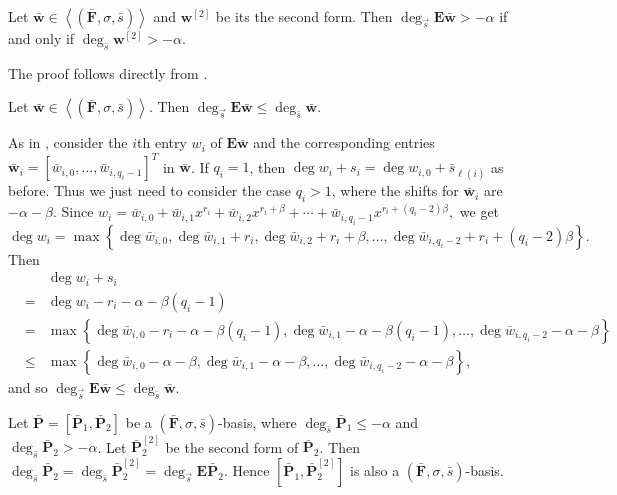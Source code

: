 \begin{cor}
\label{cor:degreeCorrespondence}Let $\bar{\mathbf{w}}\in\left\langle \left(\bar{\mathbf{F}},\sigma,\bar{s}\right)\right\rangle $
and $\mathbf{w}^{[2]}$ be its the second form. Then $\deg_{\vec{s}}\mathbf{E}\bar{\mathbf{w}}>-\alpha$
if and only if $\deg_{\bar{s}}\mathbf{w}^{[2]}>-\alpha$.\end{cor}
\begin{pf}
The proof follows directly from .\end{pf}
\begin{lem}
\label{lem:degEwLessEqDegw}Let $\bar{\mathbf{w}}\in\left\langle \left(\bar{\mathbf{F}},\sigma,\bar{s}\right)\right\rangle $.
Then $\deg_{\vec{s}}\mathbf{E}\bar{\mathbf{w}}\le\deg_{\bar{s}}\bar{\mathbf{w}}$. \end{lem}
\begin{pf}
As in , consider the $i$th entry
$w_{i}$ of $\mathbf{E}\bar{\mathbf{w}}$ and the corresponding entries
$\bar{\mathbf{w}}_{i}=\left[\bar{w}_{i,0},\dots,\bar{w}_{i,q_{i}-1}\right]^{T}$
in $\bar{\mathbf{w}}$. If $q_{i}=1$, then $\deg w_{i}+s_{i}=\deg w_{i,0}+\bar{s}_{\ell(i)}$
as before. Thus we just need to consider the case $q_{i}>1$, where
the shifts for $\bar{\mathbf{w}}_{i}$ are $-\alpha-\beta$. Since
$w_{i}=\bar{w}_{i,0}+\bar{w}_{i,1}x^{r_{i}}+\bar{w}_{i,2}x^{r_{i}+\beta}+\cdots+\bar{w}_{i,q_{i}-1}x^{r_{i}+(q_{i}-2)\beta},$
we get \[
\deg w_{i}=\max\left\{ \deg\bar{w}_{i,0},\deg\bar{w}_{i,1}+r_{i},\deg\bar{w}_{i,2}+r_{i}+\beta,\dots,\deg\bar{w}_{i,q_{i}-2}+r_{i}+(q_{i}-2)\beta\right\} .\]
 Then \begin{eqnarray*}
 &  & \deg w_{i}+s_{i}\\
 & = & \deg w_{i}-r_{i}-\alpha-\beta(q_{i}-1)\\
 & = & \max\left\{ \deg\bar{w}_{i,0}-r_{i}-\alpha-\beta(q_{i}-1),\deg\bar{w}_{i,1}-\alpha-\beta(q_{i}-1),\dots,\deg\bar{w}_{i,q_{i}-2}-\alpha-\beta\right\} \\
 & \le & \max\left\{ \deg\bar{w}_{i,0}-\alpha-\beta,\deg\bar{w}_{i,1}-\alpha-\beta,\dots,\deg\bar{w}_{i,q_{i}-2}-\alpha-\beta\right\} ,\end{eqnarray*}
 and so $\deg_{\vec{s}}\mathbf{E}\bar{\mathbf{w}}\le\deg_{\bar{s}}\bar{\mathbf{w}}$.\end{pf}
\begin{cor}
\label{cor:P2Degree}Let $\bar{\mathbf{P}}=[\bar{\mathbf{P}}_{1},\bar{\mathbf{P}}_{2}]$
be a $\left(\bar{\mathbf{F}},\sigma,\bar{s}\right)$-basis, where
$\deg_{\bar{s}}\bar{\mathbf{P}}_{1}\le-\alpha$ and $\deg_{\bar{s}}\bar{\mathbf{P}}_{2}>-\alpha$.
Let $\bar{\mathbf{P}}_{2}^{[2]}$ be the second form of $\bar{\mathbf{P}}_{2}$.
Then $\deg_{\bar{s}}\bar{\mathbf{P}}_{2}=\deg_{\bar{s}}\bar{\mathbf{P}}_{2}^{[2]}=\deg_{\vec{s}}\mathbf{E}\bar{\mathbf{P}}_{2}$.
Hence $[\bar{\mathbf{P}}_{1},\bar{\mathbf{P}}_{2}^{[2]}]$ is also
a $(\bar{\mathbf{F}},\sigma,\bar{s})$-basis.\end{cor}
